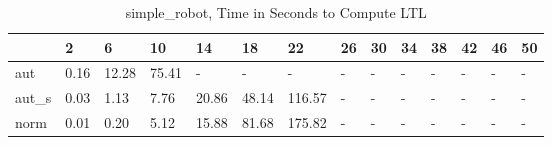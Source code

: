\begin{table}
\caption{simple_robot, Time in Seconds to Compute LTL}
\label{simple_robot_LTL_time}
\begin{tabular}{llllllllllllll}
\toprule
 & 2 & 6 & 10 & 14 & 18 & 22 & 26 & 30 & 34 & 38 & 42 & 46 & 50 \\
\midrule
aut & 0.16 & 12.28 & 75.41 & - & - & - & - & - & - & - & - & - & - \\
aut_s & 0.03 & 1.13 & 7.76 & 20.86 & 48.14 & 116.57 & - & - & - & - & - & - & - \\
norm & 0.01 & 0.20 & 5.12 & 15.88 & 81.68 & 175.82 & - & - & - & - & - & - & - \\
\bottomrule
\end{tabular}
\end{table}
